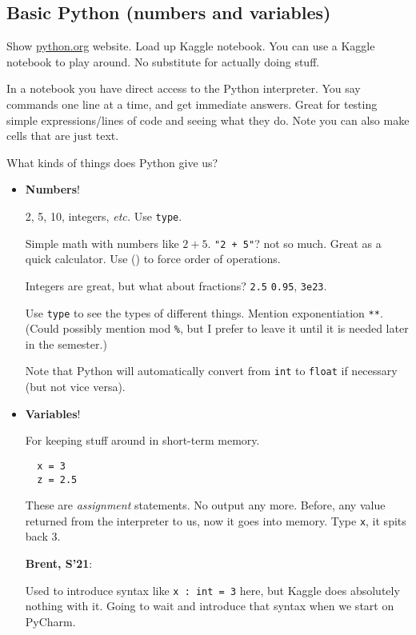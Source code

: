 \documentclass{article}
\newcommand{\etc}{\emph{etc.}\xspace}
\newenvironment{reflect}[1]
{
  \noindent
  \begin{lrbox}{\reflectbox}
    \begin{minipage}[t]{\textwidth}
      \textbf{#1}:
}{
    \end{minipage}
  \end{lrbox}
  \fbox{\usebox{\reflectbox}}
}
\begin{document}
\subsection*{Basic Python (numbers and variables)}

Show \url{python.org} website.  Load up Kaggle notebook.  You can use
a Kaggle notebook to play around.  No substitute for actually doing
stuff.

In a notebook you have direct access to the Python interpreter.  You
say commands one line at a time, and get immediate answers.  Great for
testing simple expressions/lines of code and seeing what they do.
Note you can also make cells that are just text.

What kinds of things does Python give us?

\begin{itemize}
\item \textbf{Numbers}!

  2, 5, 10, integers, \etc  Use \texttt{type}.

  Simple math with numbers like $2+5$. \texttt{"2 + 5"}? not so much.
  Great as a quick calculator. Use () to force order of operations.

  Integers are great, but what about fractions? \texttt{2.5}
  \texttt{0.95}, \texttt{3e23}.

  Use \verb|type| to see the types of different things.  Mention
  exponentiation \verb|**|. (Could possibly mention mod \verb|%|, but
  I prefer to leave it until it is needed later in the semester.)

  Note that Python will automatically convert from \verb|int| to
  \verb|float| if necessary (but not vice versa).

\item \textbf{Variables}!

  For keeping stuff around in short-term memory.
\begin{verbatim}
  x = 3
  z = 2.5
\end{verbatim}
  These are \emph{assignment} statements.  No output any more. Before,
  any value returned from the interpreter to us, now it goes into
  memory.  Type \texttt{x}, it spits back 3.

  \begin{reflect}{Brent, S'21}
    Used to introduce syntax like \texttt{x : int = 3} here, but
    Kaggle does absolutely nothing with it.  Going to wait and
    introduce that syntax when we start on PyCharm.
  \end{reflect}


\end{itemize}
\end{document}
